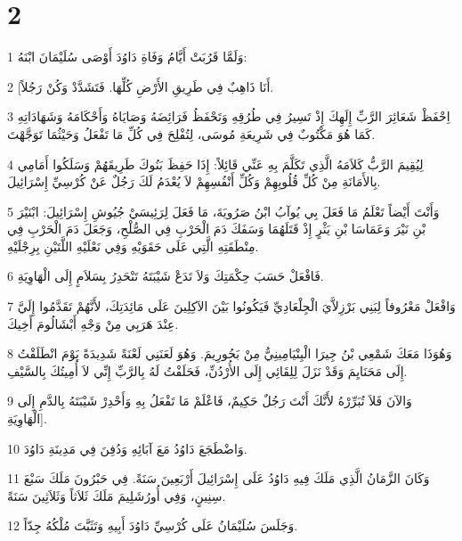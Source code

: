 \chapter{2}

\par 1 وَلَمَّا قَرُبَتْ أَيَّامُ وَفَاةِ دَاوُدَ أَوْصَى سُلَيْمَانَ ابْنَهُ:
\par 2 [أَنَا ذَاهِبٌ فِي طَرِيقِ الأَرْضِ كُلِّهَا. فَتَشَدَّدْ وَكُنْ رَجُلاً.
\par 3 اِحْفَظْ شَعَائِرَ الرَّبِّ إِلَهِكَ إِذْ تَسِيرُ فِي طُرُقِهِ وَتَحْفَظُ فَرَائِضَهُ وَصَايَاهُ وَأَحْكَامَهُ وَشَهَادَاتِهِ كَمَا هُوَ مَكْتُوبٌ فِي شَرِيعَةِ مُوسَى، لِتُفْلِحَ فِي كُلِّ مَا تَفْعَلُ وَحَيْثُمَا تَوَجَّهْتَ.
\par 4 لِيُقِيمَ الرَّبُّ كَلاَمَهُ الَّذِي تَكَلَّمَ بِهِ عَنِّي قَائِلاً: إِذَا حَفِظَ بَنُوكَ طَرِيقَهُمْ وَسَلَكُوا أَمَامِي بِالأَمَانَةِ مِنْ كُلِّ قُلُوبِهِمْ وَكُلِّ أَنْفُسِهِمْ لاَ يُعْدَمُ لَكَ رَجُلٌ عَنْ كُرْسِيِّ إِسْرَائِيلَ.
\par 5 وَأَنْتَ أَيْضاً تَعْلَمُ مَا فَعَلَ بِي يُوآبُ ابْنُ صَرُويَةَ، مَا فَعَلَ لِرَئِيسَيْ جُيُوشِ إِسْرَائِيلَ: ابْنَيْرَ بْنِ نَيْرَ وَعَمَاسَا بْنِ يَثْرٍ إِذْ قَتَلَهُمَا وَسَفَكَ دَمَ الْحَرْبِ فِي الصُّلْحِ، وَجَعَلَ دَمَ الْحَرْبِ فِي مِنْطَقَتِهِ الَّتِي عَلَى حَقَوَيْهِ وَفِي نَعْلَيْهِ اللَّتَيْنِ بِرِجْلَيْهِ.
\par 6 فَافْعَلْ حَسَبَ حِكْمَتِكَ وَلاَ تَدَعْ شَيْبَتَهُ تَنْحَدِرُ بِسَلاَمٍ إِلَى الْهَاوِيَةِ.
\par 7 وَافْعَلْ مَعْرُوفاً لِبَنِي بَرْزِلاَّيَ الْجِلْعَادِيِّ فَيَكُونُوا بَيْنَ الآكِلِينَ عَلَى مَائِدَتِكَ، لأَنَّهُمْ تَقَدَّمُوا إِلَيَّ عِنْدَ هَرَبِي مِنْ وَجْهِ أَبْشَالُومَ أَخِيكَ.
\par 8 وَهُوَذَا مَعَكَ شَمْعِي بْنُ جِيرَا الْبِنْيَامِينِيُّ مِنْ بَحُورِيمَ. وَهُوَ لَعَنَنِي لَعْنَةً شَدِيدَةً يَوْمَ انْطَلَقْتُ إِلَى مَحَنَايِمَ وَقَدْ نَزَلَ لِلِقَائِي إِلَى الأُرْدُنِّ، فَحَلَفْتُ لَهُ بِالرَّبِّ إِنِّي لاَ أُمِيتُكَ بِالسَّيْفِ.
\par 9 وَالآنَ فَلاَ تُبَرِّرْهُ لأَنَّكَ أَنْتَ رَجُلٌ حَكِيمٌ، فَاعْلَمْ مَا تَفْعَلُ بِهِ وَأَحْدِرْ شَيْبَتَهُ بِالدَّمِ إِلَى الْهَاوِيَةِ].
\par 10 وَاضْطَجَعَ دَاوُدُ مَعَ آبَائِهِ وَدُفِنَ فِي مَدِينَةِ دَاوُدَ.
\par 11 وَكَانَ الزَّمَانُ الَّذِي مَلَكَ فِيهِ دَاوُدُ عَلَى إِسْرَائِيلَ أَرْبَعِينَ سَنَةً. فِي حَبْرُونَ مَلَكَ سَبْعَ سِنِينٍ، وَفِي أُورُشَلِيمَ مَلَكَ ثَلاَثاً وَثَلاَثِينَ سَنَةً.
\par 12 وَجَلَسَ سُلَيْمَانُ عَلَى كُرْسِيِّ دَاوُدَ أَبِيهِ وَتَثَبَّتَ مُلْكُهُ جِدّاً.
